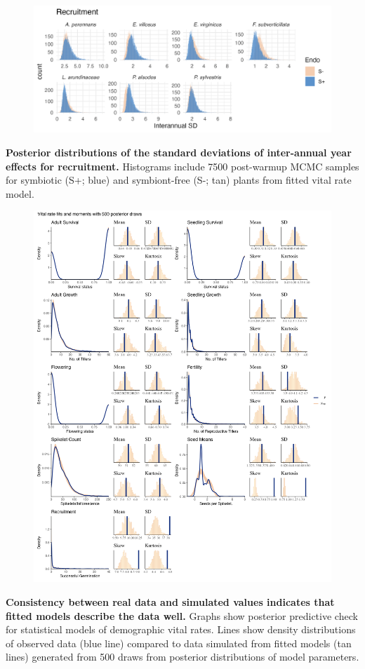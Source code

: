 \documentclass[12pt]{article}
\begin{document}
\begin{figure}[H]
	\centering
	\includegraphics[width=.9\linewidth]{recruit_sigmayear_hist.png}
\end{figure}
 \textbf{Posterior distributions of the standard deviations of inter-annual year effects for recruitment.} Histograms include 7500 post-warmup MCMC samples for symbiotic (S+; blue) and symbiont-free (S-; tan) plants from fitted vital rate model.

\newpage



\begin{figure}
	\centering
	\includegraphics[width=.7\linewidth]{fitsandmoments_plot.png}
\end{figure}
 \textbf{Consistency between real data and simulated values indicates that fitted models describe the data well.} Graphs show posterior predictive check for statistical models of demographic vital rates. Lines show density distributions of observed data (blue line) compared to data simulated from fitted models (tan lines) generated from 500 draws from posterior distributions of model parameters. 
\newpage
\end{document}
